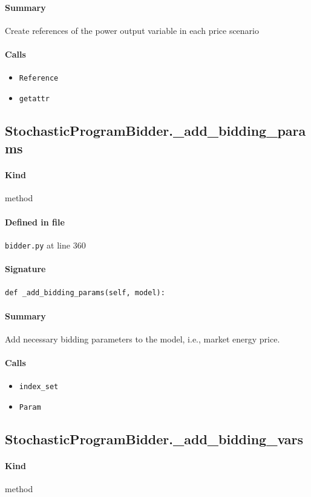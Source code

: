 \documentclass[11pt]{report}
\begin{document}
\paragraph{Summary} Create references of the power output variable in each price scenario
\paragraph{Calls}
\begin{itemize}[leftmargin=*]
  \item \texttt{Reference}
  \item \texttt{getattr}
\end{itemize}
\subsection{StochasticProgramBidder.\_add\_bidding\_params}
\label{def:bidder.py:StochasticProgramBidder._add_bidding_params:L360}
\paragraph{Kind} method
\paragraph{Defined in file} \texttt{bidder.py} at line 360
\paragraph{Signature} \texttt{def \_add\_bidding\_params(self, model):}
\paragraph{Summary} Add necessary bidding parameters to the model, i.e., market energy price.
\paragraph{Calls}
\begin{itemize}[leftmargin=*]
  \item \texttt{index\_set}
  \item \texttt{Param}
\end{itemize}
\subsection{StochasticProgramBidder.\_add\_bidding\_vars}
\label{def:bidder.py:StochasticProgramBidder._add_bidding_vars:L385}
\paragraph{Kind} method
\end{document}
